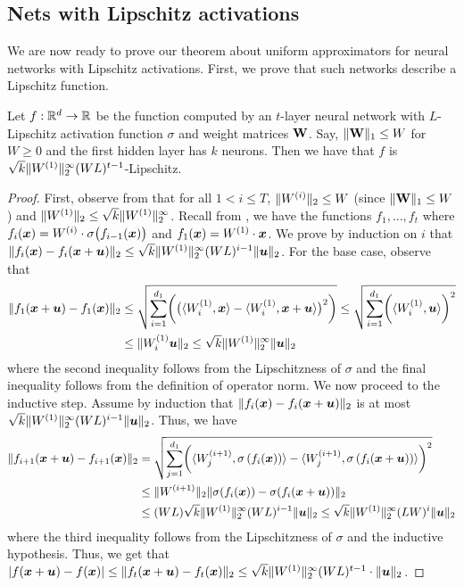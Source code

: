 \subsection{Nets with Lipschitz activations}

We are now ready to prove our theorem about uniform approximators for neural networks with Lipschitz activations. First, we prove that such networks describe a Lipschitz function. 

    
\begin{lemma}
\label{lem:neural_net_lipschitz}
    Let $f:\mathbb{R}^{d}\to \mathbb{R}$ be the function computed by an $t$-layer neural network with $L$-Lipschitz activation function $\sigma$ and weight matrices $\mathbf{W}$. Say, $\|\mathbf{W}\|_1\leq W$ for $W\geq 0$ and the first hidden layer has $k$ neurons. Then we have that $f$ is $\sqrt{k}\|W^{(1)}\|_{2}^{\infty}(WL)^{t-1}$-Lipschitz.
\end{lemma}
\begin{proof}
    First, observe from  that for all $1<i\leq T$, $\|W^{(i)}\|_{2}\leq W$ (since $\|\mathbf{W}\|_1\leq W$) and $\|W^{(1)}\|_{2}\leq \sqrt{k}\|W^{(1)}\|_{2}^{\infty}$. Recall from , we have the functions $f_1,\ldots,f_{t}$ where $f_{i}({\bm{x}})=W^{(i)}\cdot \sigma\bigl(f_{i-1}({\bm{x}})\bigr)$ and $f_1({\bm{x}})=W^{(1)}\cdot{\bm{x}}$. We prove by induction on $i$ that $\|f_{i}({\bm{x}})-f_{i}({\bm{x}}+{\bm{u}})\|_{2}\leq \sqrt{k}\|W^{(1)}\|_{2}^{\infty}(WL)^{i-1}\|{\bm{u}}\|_{2}$. For the base case, observe that 
    \begin{align*}
        \|f_1({\bm{x}}+{\bm{u}})-f_1({\bm{x}})\|_{2}&\leq \sqrt{\sum_{i=1}^{d_1}\biggl(\bigl(\langle W^{(1)}_i,{\bm{x}}\rangle-\langle W^{(1)}_i,{\bm{x}}+{\bm{u}}\rangle\bigr)^2\biggr)}
        \leq \sqrt{\sum_{i=1}^{d_1}\biggl(\langle W^{(1)}_i, {\bm{u}}\rangle\biggr)^2}\\ &\leq \|W^{(1)}_i{\bm{u}}\|_{2}\leq\sqrt{k}\|W^{(1)}\|_{2}^{\infty}\|{\bm{u}}\|_{2}
    \end{align*} where the second inequality follows from the Lipschitzness of $\sigma$ and the final inequality follows from the definition of operator norm.
    We now proceed to the inductive step. Assume by induction that $\|f_i({\bm{x}})-f_{i}({\bm{x}}+{\bm{u}})\|_{2}$ is at most $\sqrt{k}\|W^{(1)}\|_{2}^{\infty}(WL)^{i-1}\|{\bm{u}}\|_{2}$. Thus, we have 
    \begin{align*}
        \|f_{i+1}({\bm{x}}+{\bm{u}})-f_{i+1}({\bm{x}})\|_{2}&=
         \sqrt{\sum_{j=1}^{d_1}\biggl(\langle W^{(i+1)}_j,\sigma\left(f_i({\bm{x}})\right)\rangle-\langle W^{(i+1)}_j,\sigma\left(f_i({\bm{x}}+{\bm{u}})\right)\rangle\biggr)^2} \\
        &\leq \|W^{(i+1)}\|_{2}\|\sigma(f_i({\bm{x}}))-\sigma(f_i({\bm{x}}+{\bm{u}}))\|_{2}\\
        &\leq (WL)\sqrt{k}\|W^{(1)}\|_{2}^{\infty}(WL)^{i-1}\|{\bm{u}}\|_{2}\leq \sqrt{k}\|W^{(1)}\|_{2}^{\infty}(LW)^{i}\|{\bm{u}}\|_{2}
    \end{align*}
    where the third inequality follows from the Lipschitzness of $\sigma$ and the inductive hypothesis. Thus, we get that $|f({\bm{x}}+{\bm{u}})-f({\bm{x}})|\leq \|f_{t}({\bm{x}}+{\bm{u}})-f_{t}({\bm{x}})\|_{2}\leq \sqrt{k}\|W^{(1)}\|_{2}^{\infty}(WL)^{t-1}\cdot \|{\bm{u}}\|_{2}$.
\end{proof}

